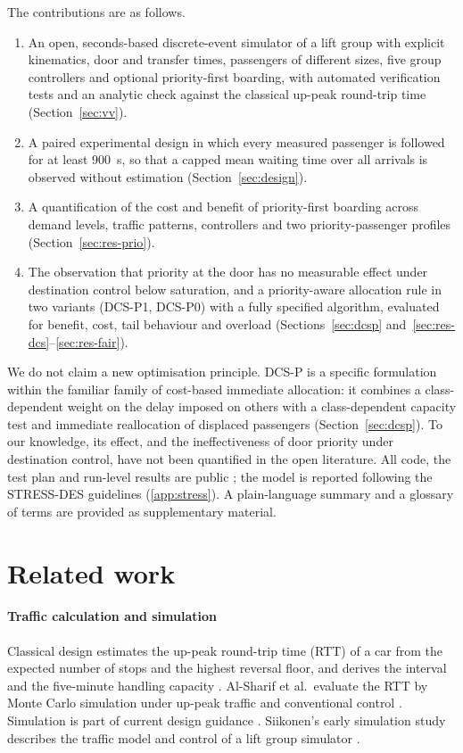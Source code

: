 \documentclass[12pt,a4paper]{article}
\begin{document}
The contributions are as follows.
\begin{enumerate}[itemsep=1pt]
\item An open, seconds-based discrete-event simulator of a lift group with explicit kinematics, door and transfer times, passengers of different sizes, five group controllers and optional priority-first boarding, with automated verification tests and an analytic check against the classical up-peak round-trip time (Section~\ref{sec:vv}).
\item A paired experimental design in which every measured passenger is followed for at least 900~s, so that a capped mean waiting time over all arrivals is observed without estimation (Section~\ref{sec:design}).
\item A quantification of the cost and benefit of priority-first boarding across demand levels, traffic patterns, controllers and two priority-passenger profiles (Section~\ref{sec:res-prio}).
\item The observation that priority at the door has no measurable effect under destination control below saturation, and a priority-aware allocation rule in two variants (DCS-P1, DCS-P0) with a fully specified algorithm, evaluated for benefit, cost, tail behaviour and overload (Sections~\ref{sec:dcsp} and~\ref{sec:res-dcs}--\ref{sec:res-fair}).
\end{enumerate}
We do not claim a new optimisation principle. DCS-P is a specific formulation within the familiar family of cost-based immediate allocation: it combines a class-dependent weight on the delay imposed on others with a class-dependent capacity test and immediate reallocation of displaced passengers (Section~\ref{sec:dcsp}). To our knowledge, its effect, and the ineffectiveness of door priority under destination control, have not been quantified in the open literature. All code, the test plan and run-level results are public \cite{dataset}; the model is reported following the STRESS-DES guidelines \cite{monks2019} (\ref{app:stress}). A plain-language summary and a glossary of terms are provided as supplementary material.

\section{Related work}\label{sec:related}

\paragraph{Traffic calculation and simulation} Classical design estimates the up-peak round-trip time (RTT) of a car from the expected number of stops and the highest reversal floor, and derives the interval and the five-minute handling capacity \cite{barney2016}. Al-Sharif et al.\ evaluate the RTT by Monte Carlo simulation under up-peak traffic and conventional control \cite{alsharif2012}. Simulation is part of current design guidance \cite{cibse2025,iso8100}. Siikonen's early simulation study describes the traffic model and control of a lift group simulator \cite{siikonen1993}.
\end{document}
